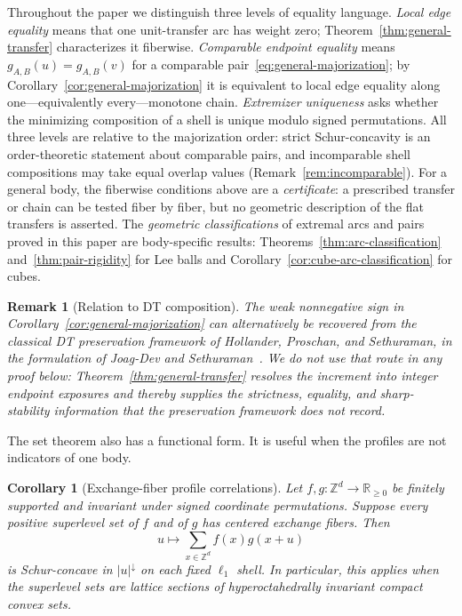 \documentclass[pdflatex,sn-mathphys-num]{sn-jnl}
\theoremstyle{thmstyleone}
\newtheorem{corollary}[theorem]{Corollary}
\theoremstyle{thmstylethree}
\theoremstyle{thmstyletwo}
\newtheorem{remark}[theorem]{Remark}
\newcommand{\Z}{\mathbb Z}
\newcommand{\R}{\mathbb R}
\begin{document}
Throughout the paper we distinguish three levels of equality language.
\emph{Local edge equality} means that one unit-transfer arc has weight zero;
Theorem~\ref{thm:general-transfer} characterizes it fiberwise.
\emph{Comparable endpoint equality} means $g_{A,B}(u)=g_{A,B}(v)$ for a
comparable pair~\eqref{eq:general-majorization}; by
Corollary~\ref{cor:general-majorization} it is equivalent to local edge
equality along one---equivalently every---monotone chain.
\emph{Extremizer uniqueness} asks whether the minimizing composition of a
shell is unique modulo signed permutations.  All three levels are relative
to the majorization order: strict Schur-concavity is an order-theoretic
statement about comparable pairs, and incomparable shell compositions may
take equal overlap values (Remark~\ref{rem:incomparable}).  For a general
body, the fiberwise conditions above are a \emph{certificate}: a prescribed
transfer or chain can be tested fiber by fiber, but no geometric
description of the flat transfers is asserted.  The \emph{geometric
classifications} of extremal arcs and pairs proved in this paper are
body-specific results: Theorems~\ref{thm:arc-classification}
and~\ref{thm:pair-rigidity} for Lee balls and
Corollary~\ref{cor:cube-arc-classification} for cubes.

\begin{remark}[Relation to DT composition]
\label{rem:dt-antecedent}
The weak nonnegative sign in Corollary~\ref{cor:general-majorization} can
alternatively be recovered from the classical DT preservation framework of
Hollander, Proschan, and Sethuraman, in the formulation of Joag-Dev and
Sethuraman~\cite{HollanderProschanSethuraman77,HollanderProschanSethuraman81,
JoagDevSethuraman92}.  We do not use that route in any proof below:
Theorem~\ref{thm:general-transfer} resolves the increment into integer
endpoint exposures and thereby supplies the strictness, equality, and
sharp-stability information that the preservation framework does not record.
\end{remark}

The set theorem also has a functional form.  It is useful when the profiles
are not indicators of one body.

\begin{corollary}[Exchange-fiber profile correlations]
\label{cor:general-profiles}
Let $f,g:\Z^d\to\R_{\ge0}$ be finitely supported and invariant under signed
coordinate permutations.  Suppose every positive superlevel set of $f$ and
of $g$ has centered exchange fibers.  Then
\[
 u\longmapsto\sum_{x\in\Z^d}f(x)g(x+u)
\]
is Schur-concave in $|u|^\downarrow$ on each fixed $\ell_1$ shell.
In particular, this applies when the superlevel sets are lattice sections of
hyperoctahedrally invariant compact convex sets.
\end{corollary}
\end{document}
